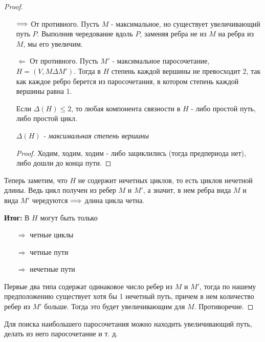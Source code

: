 \begin{proof}
  \text{}

  \begin{enumerate}
    \item[$\Longrightarrow$] От противного. Пусть $M$ - максимальное, но существует увеличивающий путь $P$. Выполнив чередование вдоль $P$, заменяя ребра не из $M$ на ребра из $M$, мы его увеличим.
    \item[$\Longleftarrow$] От противного. Пусть $M'$ - максимальное паросочетание, $H = (V, M \Delta M')$. Тогда в $H$ степень каждой вершины не превосходит 2, так как каждое ребро берется из паросочетания, в котором степень каждой вершины равна 1.
    \begin{lemma}
      Если $\Delta(H) \le 2$, то любая компонента связности в $H$ - либо простой путь, либо простой цикл.
    \end{lemma}

    \textit{$\Delta(H)$ - максимальная степень вершины}

    \begin{proof}
      Ходим, ходим, ходим - либо зациклились (тогда предпериода нет), либо дошли до конца пути.
    \end{proof}
  \end{enumerate}

  Теперь заметим, что $H$ не содержит нечетных циклов, то есть циклов нечетной длины. Ведь цикл получен из ребер $M$ и $M'$, а значит, в нем ребра вида $M$ и вида $M'$ чередуются $\Longrightarrow$ длина цикла четна.

  \newpage
  \textbf{Итог:} В $H$ могут быть только
  
  \begin{enumerate}
    \item[$\Rightarrow$] четные циклы
    \item[$\Rightarrow$] четные пути
    \item[$\Rightarrow$] нечетные пути
  \end{enumerate}

  Первые два типа содержат одинаковое число ребер из $M$ и $M'$, тогда по нашему предположению существует хотя бы 1 нечетный путь, причем в нем количество ребер из $M'$ больше. Тогда это будет увеличивающим для $M$. Противоречие.
\end{proof}

\begin{note}
Для поиска наибольшего паросочетания можно находить увеличивающий путь, делать из него паросочетание и т. д.
\end{note}

